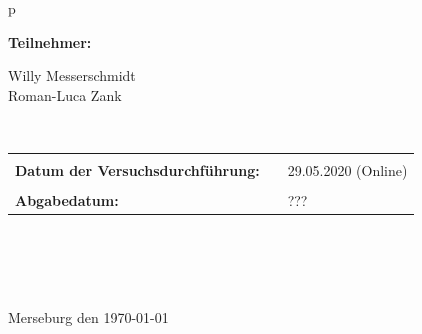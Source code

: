 \begin{center}
\begin{tabular}{p{\textwidth}}

\begin{center}
\Large{\textbf{Teilnehmer:}} \\ 
\end{center}
\begin{center}
\large{Willy Messerschmidt \\
	Roman-Luca Zank} \\
\end{center}


\\

\begin{center}
\begin{tabular}{lll}
&&\\
\large{\textbf{Datum der Versuchsdurchführung:}}&& \large{29.05.2020 (Online)}\\
&&\\
\large{\textbf{Abgabedatum:}}&& \large{???}
\end{tabular}
\end{center}

\\ \\ \\ \\
\large{Merseburg den \today}

\end{tabular}
\end{center}
